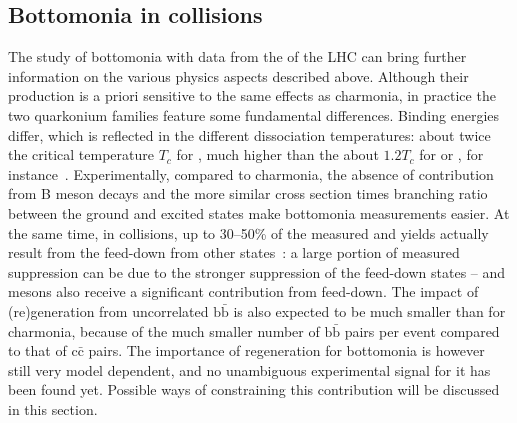 \documentclass[../report.tex]{subfiles}
\begin{document}

\subsection{Bottomonia in \PbPb collisions}%


The study of bottomonia with \PbPb data from the \RunsThreeFour of the LHC can bring further information on the various physics aspects described above.
Although their production is a priori sensitive to the same effects as charmonia, in practice the two quarkonium families feature some fundamental differences.
Binding energies differ, which is reflected in the different dissociation temperatures: about twice the critical temperature $T_c$ for , much higher than the about
$1.2 T_c$ for \PJgy or , for instance~\cite{Mocsy:2007jz}. Experimentally, compared to charmonia, the absence of contribution from B meson decays and the more similar cross section times branching ratio between the ground and excited states make bottomonia measurements easier. 
At the same time, in \pp collisions, up to 30--50\% of the measured 
 and  yields actually result from the feed-down from other states~\cite{Andronic:2015wma,Aaij:2014caa}:
a large portion of measured  suppression can be due to the stronger suppression of the feed-down states --  and  mesons also receive a significant contribution from feed-down.
The impact of (re)generation from uncorrelated $\text{b}\bar{\text{b}}$ is also expected to be much smaller than for charmonia, because of the much smaller number of $\text{b}\bar{\text{b}}$
pairs per \PbPb event compared to that of $\text{c}\bar{\text{c}}$ pairs. The importance of regeneration for bottomonia is however still very model dependent, and no unambiguous experimental signal
for it has been found yet. Possible ways of constraining this contribution will be discussed in this section.
\end{document}
